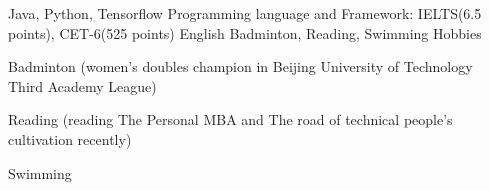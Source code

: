 \begin{cventries}
  \cventry
    {Java, Python, Tensorflow}
    {Programming language and Framework:}
    {}
    {}
    {
    }
      \cventry
    {IELTS(6.5 points), CET-6(525 points)}
    {English}
    {}
    {}
    {
    }
       \cventry
    {Badminton, Reading, Swimming}
    {Hobbies}
    {}
    {}
    {
      \begin{cvitems}
              \item {Badminton (women's doubles champion in Beijing University of Technology Third Academy League)}
        \item {Reading (reading The Personal MBA and The road of technical people's cultivation recently)}
        \item{Swimming}
      \end{cvitems}
    }
   
\end{cventries}
